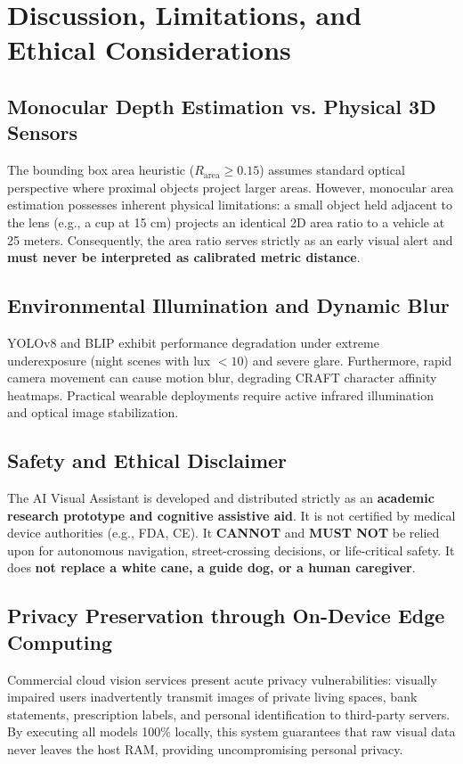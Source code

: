 \documentclass[conference]{IEEEtran}
\begin{document}
\section{Discussion, Limitations, and Ethical Considerations}

\subsection{Monocular Depth Estimation vs. Physical 3D Sensors}
The bounding box area heuristic ($R_{\text{area}} \ge 0.15$) assumes standard optical perspective where proximal objects project larger areas. However, monocular area estimation possesses inherent physical limitations: a small object held adjacent to the lens (e.g., a cup at 15 cm) projects an identical 2D area ratio to a vehicle at 25 meters. Consequently, the area ratio serves strictly as an early visual alert and \textbf{must never be interpreted as calibrated metric distance}.

\subsection{Environmental Illumination and Dynamic Blur}
YOLOv8 and BLIP exhibit performance degradation under extreme underexposure (night scenes with lux $< 10$) and severe glare. Furthermore, rapid camera movement can cause motion blur, degrading CRAFT character affinity heatmaps. Practical wearable deployments require active infrared illumination and optical image stabilization.

\subsection{Safety and Ethical Disclaimer}
The AI Visual Assistant is developed and distributed strictly as an \textbf{academic research prototype and cognitive assistive aid}. It is not certified by medical device authorities (e.g., FDA, CE). It \textbf{CANNOT} and \textbf{MUST NOT} be relied upon for autonomous navigation, street-crossing decisions, or life-critical safety. It does \textbf{not replace a white cane, a guide dog, or a human caregiver}.

\subsection{Privacy Preservation through On-Device Edge Computing}
Commercial cloud vision services present acute privacy vulnerabilities: visually impaired users inadvertently transmit images of private living spaces, bank statements, prescription labels, and personal identification to third-party servers. By executing all models 100\% locally, this system guarantees that raw visual data never leaves the host RAM, providing uncompromising personal privacy.
\end{document}
